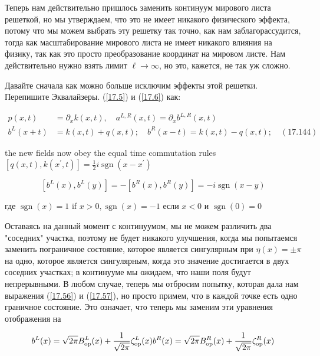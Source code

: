 \documentclass[main.tex]{subfiles}
\begin{document}
Теперь нам действительно пришлось заменить континуум мирового листа решеткой, но мы утверждаем, что это не имеет никакого физического эффекта, потому что мы можем выбрать эту решетку так точно, как нам заблагорассудится, тогда как масштабирование мирового листа не имеет никакого влияния на физику, так как это просто преобразование координат на мировом листе. Нам действительно нужно взять лимит $\ell \rightarrow \infty$, но это, кажется, не так уж сложно.

Давайте сначала как можно больше исключим эффекты этой решетки. Перепишите Эквалайзеры. (\ref{17.5}) и (\ref{17.6}) как:

\begin{equation}\label{17.144}
\begin{aligned}
p(x, t) &=\partial_{x} k(x, t), \quad a^{L, R}(x, t)=\partial_{x} b^{L, R}(x, t) \\
b^{L}(x+t) &=k(x, t)+q(x, t) ; \quad b^{R}(x-t)=k(x, t)-q(x, t) ; \quad(17.144)
\end{aligned}
\end{equation}

the new fields now obey the equal time commutation rules $\left[q(x, t), k\left(x^{\prime}, t\right)\right]=\frac{1}{2} i \operatorname{sgn}\left(x-x^{\prime}\right)$

\begin{equation}\label{17.146}
\left[b^{L}(x), b^{L}(y)\right]=-\left[b^{R}(x), b^{R}(y)\right]=-i \operatorname{sgn}(x-y)
\end{equation}

где $\operatorname{sgn}(x)=1$ if $x>0, \operatorname{sgn}(x)=-1$ если $x<0$ и $\operatorname{sgn}(0)=0$

Оставаясь на данный момент с континуумом, мы не можем различить два "соседних" участка, поэтому не будет никакого улучшения, когда мы попытаемся заменить пограничное состояние, которое является сингулярным при $\eta(x)=\pm \pi$ на одно, которое является сингулярным, когда это значение достигается в двух соседних участках; в континууме мы ожидаем, что наши поля будут непрерывными. В любом случае, теперь мы отбросим попытку, которая дала нам выражения (\ref{17.56}) и (\ref{17.57}), но просто примем, что в каждой точке есть одно граничное состояние. Это означает, что теперь мы заменим эти уравнения отображения на

\begin{equation}\label{17.148}
b^{L}(x)=\sqrt{2 \pi} B_{\mathrm{op}}^{L}(x)+\frac{1}{\sqrt{2 \pi}} \zeta_{\mathrm{op}}^{L}(x)\\
b^{R}(x)=\sqrt{2 \pi} B_{\mathrm{op}}^{R}(x)+\frac{1}{\sqrt{2 \pi}} \zeta_{\mathrm{op}}^{R}(x)
\end{equation}
\end{document}
